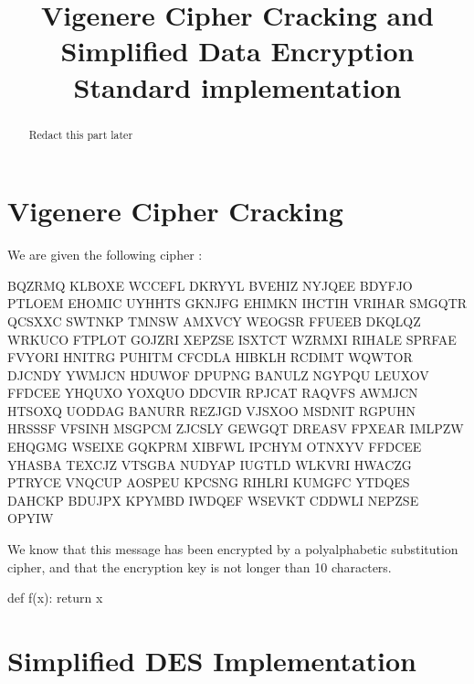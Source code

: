 \documentclass{article}
\title{\textbf{ Vigenere Cipher Cracking and Simplified Data Encryption Standard implementation}}
\author{}
\date{}
\begin{document}
\maketitle \thispagestyle{fancy}

\begin{abstract}
    Redact this part later
    
\end{abstract}

\section{Vigenere Cipher Cracking}

    We are given the following cipher :

    \begin{python}
        BQZRMQ KLBOXE WCCEFL DKRYYL BVEHIZ NYJQEE BDYFJO PTLOEM EHOMIC
        UYHHTS GKNJFG EHIMKN IHCTIH VRIHAR SMGQTR QCSXXC SWTNKP TMNSW
        AMXVCY WEOGSR FFUEEB DKQLQZ WRKUCO FTPLOT GOJZRI XEPZSE ISXTCT
        WZRMXI RIHALE SPRFAE FVYORI HNITRG PUHITM CFCDLA HIBKLH RCDIMT
        WQWTOR DJCNDY YWMJCN HDUWOF DPUPNG BANULZ NGYPQU LEUXOV FFDCEE
        YHQUXO YOXQUO DDCVIR RPJCAT RAQVFS AWMJCN HTSOXQ UODDAG BANURR
        REZJGD VJSXOO MSDNIT RGPUHN HRSSSF VFSINH MSGPCM ZJCSLY GEWGQT
        DREASV FPXEAR IMLPZW EHQGMG WSEIXE GQKPRM XIBFWL IPCHYM OTNXYV
        FFDCEE YHASBA TEXCJZ VTSGBA NUDYAP IUGTLD WLKVRI HWACZG PTRYCE
        VNQCUP AOSPEU KPCSNG RIHLRI KUMGFC YTDQES DAHCKP BDUJPX KPYMBD
        IWDQEF WSEVKT CDDWLI NEPZSE OPYIW
    \end{python}

    We know that this message has been encrypted by a polyalphabetic substitution cipher,
    and that the encryption key is not longer than 10 characters.



\begin{python}
    def f(x):
        return x
\end{python}

\section{Simplified DES Implementation}




\end{document}

